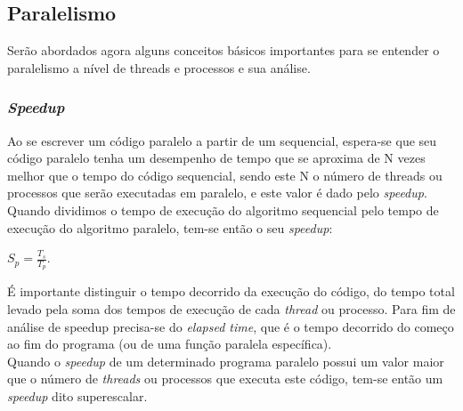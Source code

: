 \documentclass[12pt]{article}
\newcommand\tab[1][1cm]{\hspace*{#1}}
\begin{document}
\subsection{Paralelismo}\label{subsec:paralel}

\tab Serão abordados agora alguns conceitos básicos importantes para se entender o paralelismo a nível de threads e processos e sua análise.

\subsubsection{\textit{Speedup}}\label{subsubsec:speedup}
\tab Ao se escrever um código paralelo a partir de um sequencial, espera-se que seu código paralelo tenha um desempenho de tempo que se aproxima de N vezes melhor que o tempo do código sequencial, sendo este N o número de threads ou processos que serão executadas em paralelo, e este valor é dado pelo \textit{speedup}. 
\\
\tab Quando dividimos o tempo de execução do algoritmo sequencial pelo tempo de execução do algoritmo paralelo, tem-se então o seu \textit{speedup}: 
\begin{center}
$S_p = \frac{T_s}{T_p}$. 
\end{center}
\tab É importante distinguir o tempo decorrido da execução do código, do tempo total levado pela soma dos tempos de execução de cada \textit{thread} ou processo. Para fim de análise de speedup precisa-se do \textit{elapsed time}, que é o tempo decorrido do começo ao fim do programa (ou de uma função paralela específica). 
\\
\tab Quando o \textit{speedup} de um determinado programa paralelo possui um valor maior que o número de \textit{threads} ou processos que executa este código, tem-se então um \textit{speedup} dito superescalar.
\end{document}

